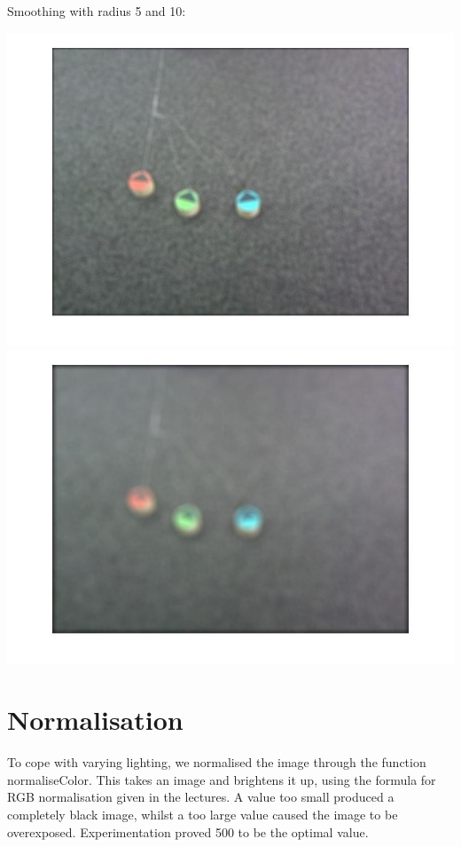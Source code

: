 \documentclass{report}
\begin{document}
Smoothing with radius 5 and 10:

\includegraphics[scale=0.2]{radius5}
\includegraphics[scale=0.2]{radius10} 

\section{Normalisation}
             
To cope with varying lighting, we normalised the image through the function normaliseColor. This takes an image and brightens it up, using the formula for RGB normalisation given in the lectures. A value too small produced a completely black image, whilst a too large value caused the image to be overexposed. Experimentation proved 500 to be the optimal value. 
\end{document}
